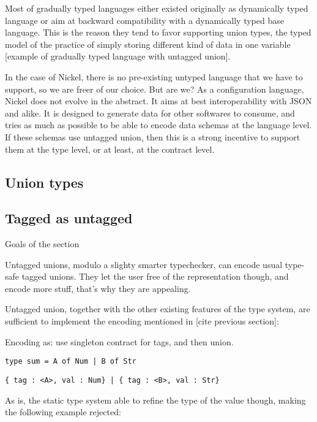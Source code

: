 \documentclass{article}
\begin{document}
Most of gradually typed languages either existed originally as dynamically typed
language or aim at backward compatibility with a dynamically typed base
language. This is the reason they tend to favor supporting union types, the
typed model of the practice of simply storing different kind of data in one
variable [example of gradually typed language with untagged union].

In the case of Nickel, there is no pre-existing untyped language that we have to
support, so we are freer of our choice. But are we? As a configuration language,
Nickel does not evolve in the abstract. It aims at best interoperability with
JSON and alike. It is designed to generate data for other softwares to consume,
and tries as much as possible to be able to encode data schemas at the language
level. If these schemas use untagged union, then this is a strong incentive to
support them at the type level, or at least, at the contract level.

\subsection{Union types}

\subsection{Tagged as untagged}
\color{red}Goals of the section

Untagged unions, modulo a slighty smarter typechecker, can encode usual type-safe
tagged unions. They let the user free of the representation though, and encode
more stuff, that's why they are appealing.\vspace{0.5cm}\color{black}

Untagged union, together with the other existing features of the type system,
are sufficient to implement the encoding mentioned in [cite previous section]:

Encoding as: use singleton contract for tags, and then union.
\begin{lstlisting}
type sum = A of Num | B of Str
\end{lstlisting}

\begin{lstlisting}
{ tag : <A>, val : Num} | { tag : <B>, val : Str}
\end{lstlisting}

As is, the static type system able to refine the type of the value though,
making the following example rejected: 
\end{document}
